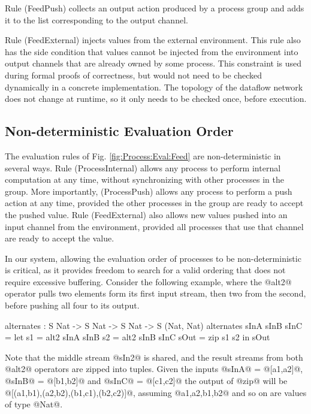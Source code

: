 Rule (FeedPush) collects an output action produced by a process group and adds it to the list corresponding to the output channel.

Rule (FeedExternal) injects values from the external environment. This rule also has the side condition that values cannot be injected from the environment into output channels that are already owned by some process. This constraint is used during formal proofs of correctness, but would not need to be checked dynamically in a concrete implementation. The topology of the dataflow network does not change at runtime, so it only needs to be checked once, before execution.


\subsection{Non-deterministic Evaluation Order}
\label{s:EvaluationOrder}

The evaluation rules of Fig. \ref{fig:Process:Eval:Feed} are non-deterministic in several ways. Rule (ProcessInternal) allows any process to perform internal computation at any time, without synchronizing with other processes in the group. More importantly, (ProcessPush) allows any process to perform a push action at any time, provided the other processes in the group are ready to accept the pushed value. Rule (FeedExternal) also allows new values pushed into an input channel from the environment, provided all processes that use that channel are ready to accept the value.

In our system, allowing the evaluation order of processes to be non-deterministic is critical, as it provides freedom to search for a valid ordering that does not require excessive buffering. Consider the following example, where the @alt2@ operator pulls two elements form its first input stream, then two from the second, before pushing all four to its output.
\begin{code}
  alternates : S Nat -> S Nat -> S Nat -> S (Nat, Nat)
  alternates sInA sInB sInC
   = let  s1   = alt2 sInA sInB
          s2   = alt2 sInB sInC
          sOut = zip s1 s2
     in   sOut
\end{code}

Note that the middle stream @sIn2@ is shared, and the result streams from both @alt2@ operators are zipped into tuples. Given the inputs @sInA@ = @[a1,a2]@, @sInB@ = @[b1,b2]@ and @sInC@ = @[c1,c2]@ the output of @zip@ will be @[(a1,b1),(a2,b2),(b1,c1),(b2,c2)]@, assuming @a1,a2,b1,b2@ and so on are values of type @Nat@.

